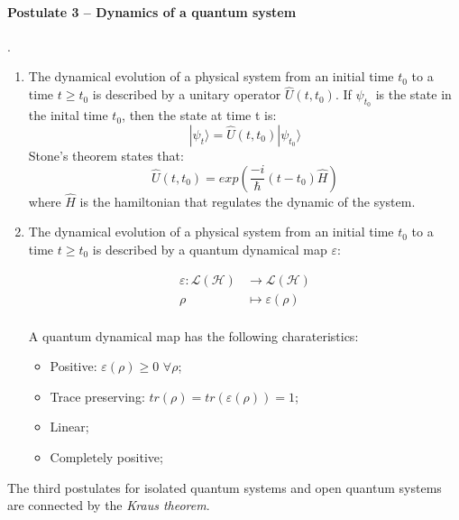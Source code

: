 \paragraph{Postulate 3 – Dynamics of a quantum system}.
\begin{enumerate}
    \renewcommand{\labelenumi}{I)}
    \item The dynamical evolution of a physical system from an initial time $t_0$ to a time $t \ge t_0$ is described by a unitary operator 
    $\hat{U}(t, t_0)$.
    If $\psi_{t_0}$ is the state in the inital time $t_0$, then the state at time t is:
    \begin{equation}
        |\psi_t \rangle = \hat{U}(t, t_0) | \psi_{t_0} \rangle
    \end{equation}
    Stone's theorem states that:
    \begin{equation}
        \hat{U}(t, t_0) = exp(\frac{-i}{\hbar} (t-t_0) \hat{H})
    \end{equation}
    where $\hat{H}$ is the hamiltonian that regulates the dynamic of the system.

    \renewcommand{\labelenumi}{O)}
    \item The dynamical evolution of a physical system from an initial time $t_0$ to a time $t \ge t_0$ is described by a quantum dynamical map $\varepsilon$:
    
    \begin{align}
        \varepsilon : \mathcal{L}(\mathcal{H}) &\rightarrow \mathcal{L}(\mathcal{H}) \\
        \rho &\mapsto \varepsilon(\rho) \\
    \end{align}

    A quantum dynamical map has the following charateristics:
    \begin{itemize}
        \item Positive: $\varepsilon(\rho) \ge 0$ $\forall \rho$;
        \item Trace preserving: $tr(\rho) = tr(\varepsilon(\rho)) = 1$;
        \item Linear;
        \item Completely positive;
    \end{itemize}
\end{enumerate}

The third postulates for isolated quantum systems and open quantum systems are connected by the \textit{Kraus theorem}.

